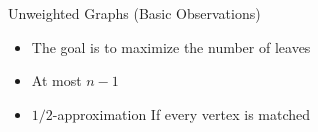 \begin{frame}{Unweighted Graphs (Basic Observations)}
\begin{itemize}
  \item The goal is to maximize the number of leaves
  \item At most $n - 1$
  \item $1/2$-approximation If every vertex is matched 
\end{itemize}
\end{frame}